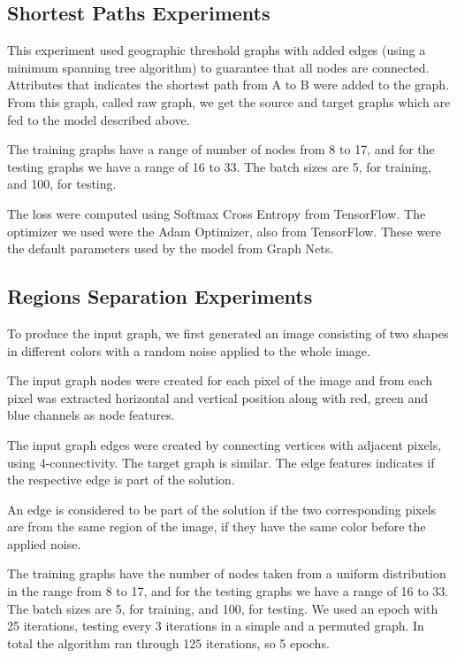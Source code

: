 \subsection{Shortest Paths Experiments}

This experiment used geographic threshold graphs with added edges (using a minimum spanning tree algorithm) to guarantee that all nodes are connected. Attributes that indicates the shortest path from A to B were added to the graph. From this graph, called raw graph, we get the source and target graphs which are fed to the model described above.

The training graphs have a range of number of nodes from 8 to 17, and for the testing graphs we have a range of 16 to 33. The batch sizes are 5, for training, and 100, for testing.

The loss were computed using Softmax Cross Entropy from TensorFlow. The optimizer we used were the Adam Optimizer, also from TensorFlow. These were the default parameters used by the model from Graph Nets.

\subsection{Regions Separation Experiments}

To produce the input graph, we first generated an image consisting of two shapes in different colors with a random noise applied to the whole image.

The input graph nodes were created for each pixel of the image and from each pixel was extracted horizontal and vertical position along with red, green and blue channels as node features.

The input graph edges were created by connecting vertices with adjacent pixels, using 4-connectivity. The target graph is similar. The edge features indicates if the respective edge is part of the solution.

An edge is considered to be part of the solution if the two corresponding pixels are from the same region of the image, if they have the same color before the applied noise.

The training graphs have the number of nodes taken from a uniform distribution in the range from 8 to 17, and for the testing graphs we have a range of 16 to 33. The batch sizes are 5, for training, and 100, for testing. We used an epoch with 25 iterations, testing every 3 iterations in a simple and a permuted graph. In total the algorithm ran through 125 iterations, so 5 epochs.

